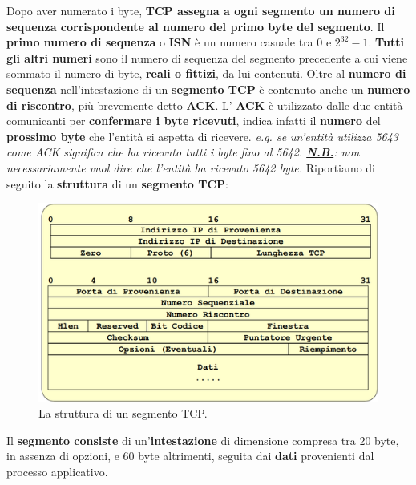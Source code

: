 \documentclass[11pt,a4paper]{article}
\theoremstyle{definition}
\begin{document}
Dopo aver numerato i byte, \textbf{TCP assegna a ogni segmento un numero di sequenza corrispondente al numero del primo byte del segmento}.
Il \textbf{primo numero di sequenza} o \textbf{ISN} è un numero casuale tra 0 e $2^{32} -1$. \textbf{Tutti gli altri numeri } sono il numero di sequenza del segmento precedente a cui viene sommato il numero di byte, \textbf{reali o fittizi}, da lui contenuti.
\newpage
Oltre al \textbf{numero di sequenza } nell'intestazione di un \textbf{segmento TCP} è contenuto anche un \textbf{numero di riscontro}, più brevemente detto \textbf{ACK}. L' \textbf{ACK} è utilizzato dalle due entità comunicanti per \textbf{confermare i byte ricevuti}, indica infatti il \textbf{numero} del \textbf{prossimo byte }che l'entità si aspetta di ricevere.\textit{ e.g. se un'entità utilizza 5643 come ACK significa che ha ricevuto tutti i byte fino al 5642. \underline{\textbf{N.B.}}: non necessariamente vuol dire che l'entità ha ricevuto 5642 byte.}\newline
Riportiamo di seguito la \textbf{struttura} di un \textbf{segmento TCP}:
\begin{figure}[!h]
	\includegraphics[scale=0.5]{Immagini/TCP_segment.png}
	\centering
	\caption{La struttura di un segmento TCP.}
\end{figure}\newline
Il \textbf{segmento consiste} di un'\textbf{intestazione} di dimensione compresa tra 20 byte, in assenza di opzioni, e 60 byte altrimenti, seguita dai \textbf{dati} provenienti dal processo applicativo.
\end{document}
